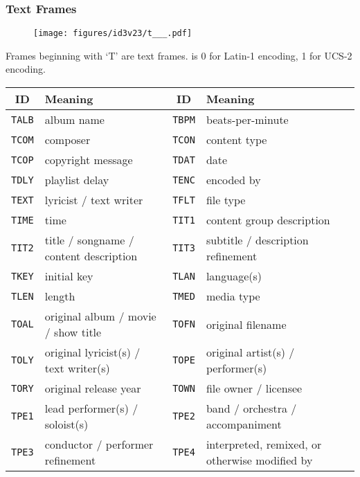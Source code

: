 \clearpage

\subsubsection{Text Frames}
\begin{figure}[h]
  \texttt{[image: figures/id3v23/t\_\_\_.pdf]}
\end{figure}
\par
\noindent
Frames beginning with `T' are text frames.
 is 0 for Latin-1 encoding, 1 for UCS-2 encoding.
\begin{table}[h]
  {
    \begin{tabular}{|c|l||c|l|}
      \hline
      ID & Meaning & ID & Meaning \\
      \hline
      \texttt{TALB} & album name &
      \texttt{TBPM} & beats-per-minute \\
      \texttt{TCOM} & composer &
      \texttt{TCON} & content type \\
      \texttt{TCOP} & copyright message &
      \texttt{TDAT} & date \\
      \texttt{TDLY} & playlist delay &
      \texttt{TENC} & encoded by \\
      \texttt{TEXT} & lyricist / text writer &
      \texttt{TFLT} & file type \\
      \texttt{TIME} & time &
      \texttt{TIT1} & content group description \\
      \texttt{TIT2} & title / songname / content description &
      \texttt{TIT3} & subtitle / description refinement \\
      \texttt{TKEY} & initial key &
      \texttt{TLAN} & language(s) \\
      \texttt{TLEN} & length &
      \texttt{TMED} & media type \\
      \texttt{TOAL} & original album / movie / show title &
      \texttt{TOFN} & original filename \\
      \texttt{TOLY} & original lyricist(s) / text writer(s) &
      \texttt{TOPE} & original artist(s) / performer(s) \\
      \texttt{TORY} & original release year &
      \texttt{TOWN} & file owner / licensee \\
      \texttt{TPE1} & lead performer(s) / soloist(s) &
      \texttt{TPE2} & band / orchestra / accompaniment \\
      \texttt{TPE3} & conductor / performer refinement &
      \texttt{TPE4} & interpreted, remixed, or otherwise modified by \\

\end{tabular}}
\end{table}
